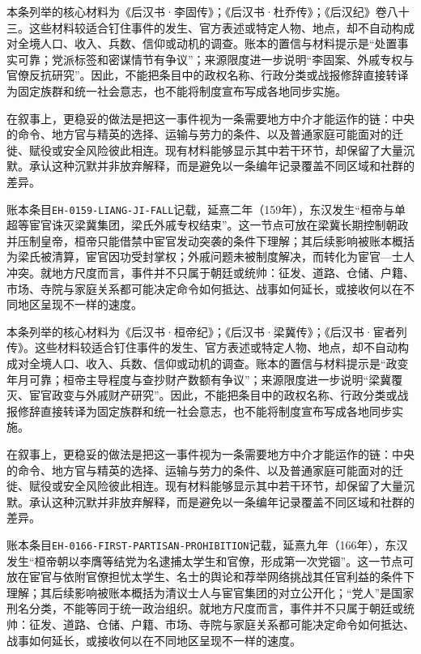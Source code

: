 本条列举的核心材料为《后汉书·李固传》；《后汉书·杜乔传》；《后汉纪》卷八十三。这些材料较适合钉住事件的发生、官方表述或特定人物、地点，却不自动构成对全境人口、收入、兵数、信仰或动机的调查。账本的置信与材料提示是“处置事实可靠；党派标签和密谋情节有争议”；来源限度进一步说明“李固案、外戚专权与官僚反抗研究”。因此，不能把条目中的政权名称、行政分类或战报修辞直接转译为固定族群和统一社会意志，也不能将制度宣布写成各地同步实施。

在叙事上，更稳妥的做法是把这一事件视为一条需要地方中介才能运作的链：中央的命令、地方官与精英的选择、运输与劳力的条件、以及普通家庭可能面对的迁徙、赋役或安全风险彼此相连。现有材料能够显示其中若干环节，却保留了大量沉默。承认这种沉默并非放弃解释，而是避免以一条编年记录覆盖不同区域和社群的差异。

账本条目\texttt{EH-0159-LIANG-JI-FALL}记载，延熹二年（159年），东汉发生“桓帝与单超等宦官诛灭梁冀集团，梁氏外戚专权结束”。这一节点可放在梁冀长期控制朝政并压制皇帝，桓帝只能借禁中宦官发动突袭的条件下理解；其后续影响被账本概括为梁氏被清算，宦官因功受封掌权；外戚问题未被制度解决，而转化为宦官—士人冲突。就地方尺度而言，事件并不只属于朝廷或统帅：征发、道路、仓储、户籍、市场、寺院与家庭关系都可能决定命令如何抵达、战事如何延长，或接收何以在不同地区呈现不一样的速度。

本条列举的核心材料为《后汉书·桓帝纪》；《后汉书·梁冀传》；《后汉书·宦者列传》。这些材料较适合钉住事件的发生、官方表述或特定人物、地点，却不自动构成对全境人口、收入、兵数、信仰或动机的调查。账本的置信与材料提示是“政变年月可靠；桓帝主导程度与查抄财产数额有争议”；来源限度进一步说明“梁冀覆灭、宦官政变与外戚财产研究”。因此，不能把条目中的政权名称、行政分类或战报修辞直接转译为固定族群和统一社会意志，也不能将制度宣布写成各地同步实施。

在叙事上，更稳妥的做法是把这一事件视为一条需要地方中介才能运作的链：中央的命令、地方官与精英的选择、运输与劳力的条件、以及普通家庭可能面对的迁徙、赋役或安全风险彼此相连。现有材料能够显示其中若干环节，却保留了大量沉默。承认这种沉默并非放弃解释，而是避免以一条编年记录覆盖不同区域和社群的差异。

账本条目\texttt{EH-0166-FIRST-PARTISAN-PROHIBITION}记载，延熹九年（166年），东汉发生“桓帝朝以李膺等结党为名逮捕太学生和官僚，形成第一次党锢”。这一节点可放在宦官与依附官僚担忧太学生、名士的舆论和荐举网络挑战其任官利益的条件下理解；其后续影响被账本概括为清议士人与宦官集团的对立公开化；“党人”是国家刑名分类，不能等同于统一政治组织。就地方尺度而言，事件并不只属于朝廷或统帅：征发、道路、仓储、户籍、市场、寺院与家庭关系都可能决定命令如何抵达、战事如何延长，或接收何以在不同地区呈现不一样的速度。

